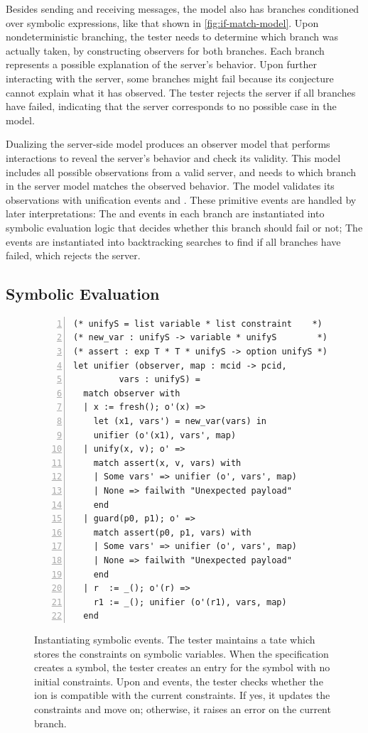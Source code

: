 Besides sending and receiving messages, the model also has  branches
conditioned over symbolic expressions, like that shown in
\autoref{fig:if-match-model}.  Upon nondeterministic branching, the tester needs to
determine which branch was actually taken, by constructing observers for both
branches.  Each branch represents a possible explanation of the server's
behavior.  Upon further interacting with the server, some branches might fail
because its conjecture cannot explain what it has observed.  The tester rejects
the server if all branches have failed, indicating that the server corresponds
to no possible case in the model.

Dualizing the server-side model produces an observer model that performs
interactions to reveal the server's behavior and check its validity.  This model
includes all possible observations from a valid server, and needs to
 which branch in the server model matches the observed behavior.
The model validates its observations with unification events  and
.  These primitive events are handled by later interpretations: The
 and  events in each branch are instantiated into symbolic
evaluation logic that decides whether this branch should fail or not; The
 events are instantiated into backtracking searches to find if
all branches have failed, which rejects the server.


\subsection{Symbolic Evaluation}
\label{sec:symbolic-evaluation}
\begin{figure}
  \begin{lstlisting}[style=customcoq,numbers=left,escapechar=\%]
(* unifyS = list variable * list constraint    *)
(* new_var : unifyS -> variable * unifyS        *)
(* assert : exp T * T * unifyS -> option unifyS *)
let unifier (observer, map : mcid -> pcid,
         vars : unifyS) =
  match observer with
  | x := fresh(); o'(x) =>
    let (x1, vars') = new_var(vars) in
    unifier (o'(x1), vars', map)
  | unify(x, v); o' =>
    match assert(x, v, vars) with
    | Some vars' => unifier (o', vars', map)
    | None => failwith "Unexpected payload"
    end
  | guard(p0, p1); o' =>
    match assert(p0, p1, vars) with
    | Some vars' => unifier (o', vars', map)
    | None => failwith "Unexpected payload"
    end
  | r  := _(); o'(r) =>
    r1 := _(); unifier (o'(r1), vars, map)
  end\end{lstlisting}
  \caption{Instantiating symbolic events.  The tester maintains a tate
    which stores the constraints on symbolic variables.  When the
    specification creates a  symbol, the tester creates an entry for
    the symbol with no initial constraints.  Upon  and
     events, the tester checks whether the ion is
    compatible with the current constraints.  If yes, it updates the constraints
    and move on; otherwise, it raises an error on the current branch.
  }
  \label{fig:unifier}
\end{figure}

